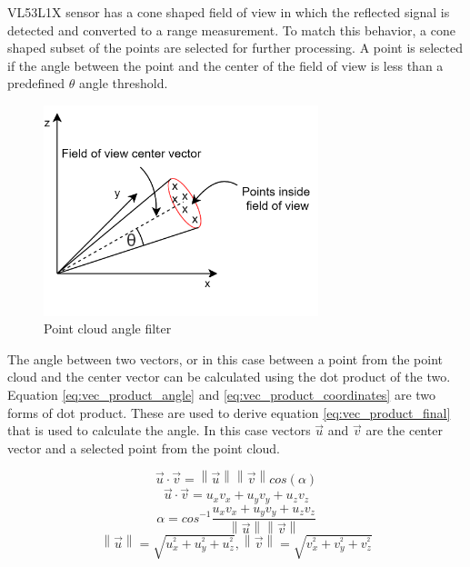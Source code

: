 VL53L1X sensor has a cone shaped field of view in which the reflected signal is detected and converted to
a range measurement. To match this behavior, a cone shaped subset of the points are selected for further
processing. A point is selected if the angle between the point and the center of the field of view is less
than a predefined $\theta$ angle threshold.

\begin{figure}[!ht]
    \centering
    \includegraphics[width=80mm, keepaspectratio]{figures/data_angle_filter.png}
    \caption{Point cloud angle filter}
    \label{fig:data_angle_filter}
\end{figure}


The angle between two vectors, or in this case between a point from the point cloud and the center vector 
can be calculated using the dot product of the two. Equation \ref{eq:vec_product_angle} and 
\ref{eq:vec_product_coordinates} are two forms of dot product. These are used to derive equation 
\ref{eq:vec_product_final} that is used to calculate the angle. In this case vectors $\vec{u}$ and 
$\vec{v}$ are the center vector and a selected point from the point cloud. 


\begin{equation} \label{eq:vec_product_angle}
    \vec{u}\cdot\vec{v}=\left\|\vec{u}\right\|\left\|\vec{v}\right\|cos(\alpha)
\end{equation}
\begin{equation} \label{eq:vec_product_coordinates}
    \vec{u}\cdot\vec{v}=u_{x}v_{x}+u_{y}v_{y}+u_{z}v_{z}
\end{equation}
\begin{equation} \label{eq:vec_product_final}
    \alpha = cos^{-1}\frac{u_{x}v_{x}+u_{y}v_{y}+u_{z}v_{z}}{\left\|\vec{u}\right\|\left\|\vec{v}\right\|}
\end{equation}
\begin{equation} \label{eq:vec_length}
\left\|\vec{u}\right\| = \sqrt{u_{x}^{^{2}}+u_{y}^{^{2}}+u_{z}^{^{2}}}, \left\|\vec{v}\right\| = \sqrt{v_{x}^{^{2}}+v_{y}^{^{2}}+v_{z}^{^{2}}}
\end{equation}

